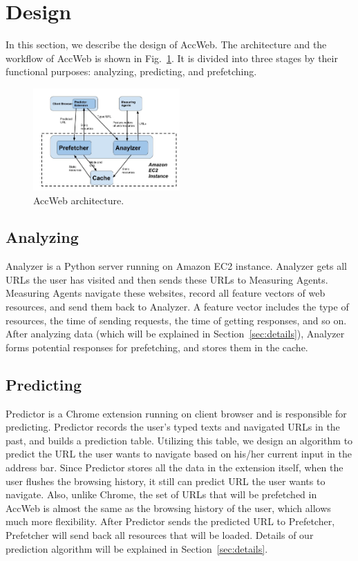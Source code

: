\section{Design}
\label{sec:design}

In this section, we describe the design of AccWeb. The architecture and the workflow of AccWeb is shown in Fig.~\ref{fig:arch}. It is divided into three stages by their functional purposes: analyzing, predicting, and prefetching.

\begin{figure}[htbp] 
	\centering
	\includegraphics[width=0.5\textwidth]{ACCWeb-Arch-3.jpg}  
	\caption{AccWeb architecture.}
	\label{fig:arch}
\end{figure} 

\subsection{Analyzing}

Analyzer is a Python server running on Amazon EC2 instance. Analyzer gets all URLs the user has visited and then sends these URLs to Measuring Agents. Measuring Agents navigate these websites, record all feature vectors of web resources, and send them back to Analyzer. A feature vector includes the type of resources, the time of sending requests, the time of getting responses, and so on. After analyzing data (which will be explained in Section~\ref{sec:details}), Analyzer forms potential responses for prefetching, and stores them in the cache.

\subsection{Predicting}

Predictor is a Chrome extension running on client browser and is responsible for predicting. Predictor records the user's typed texts and navigated URLs in the past, and builds a prediction table. Utilizing this table, we design an algorithm to predict the URL the user wants to navigate based on his/her current input in the address bar. Since Predictor stores all the data in the extension itself, when the user flushes the browsing history, it still can predict URL the user wants to navigate. Also, unlike Chrome, the set of URLs that will be prefetched in AccWeb is almost the same as the browsing history of the user, which allows much more flexibility. After Predictor sends the predicted URL to Prefetcher, Prefetcher will send back all resources that will be loaded. Details of our prediction algorithm will be explained in Section~\ref{sec:details}.

